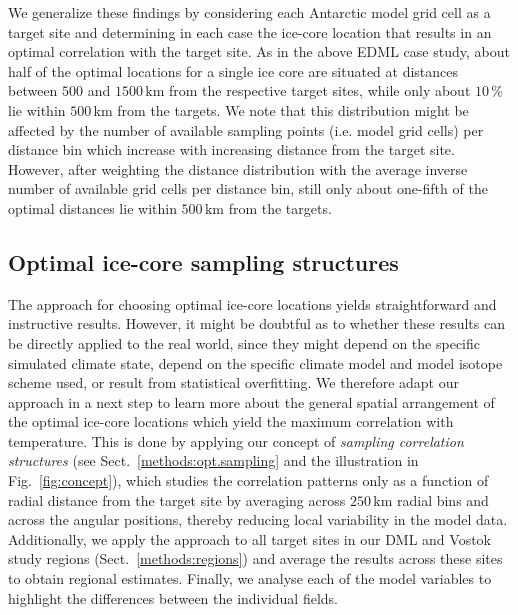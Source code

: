 \documentclass[cp]{copernicus}
\begin{document}
We generalize these findings by considering each Antarctic model grid cell as a
target site and determining in each case the ice-core location that results in
an optimal correlation with the target site. As in the above EDML case study,
about half of the optimal locations for a single ice core are situated at
distances between $500$ and $1500$\,km from the respective target sites, while
only about $10$\,\% lie within $500$\,km from the targets. We note that this
distribution might be affected by the number of available sampling points (i.e.
model grid cells) per distance bin which increase with increasing distance from
the target site. However, after weighting the distance distribution with the
average inverse number of available grid cells per distance bin, still only
about one-fifth of the optimal distances lie within $500$\,km from the targets.

\subsection{Optimal ice-core sampling structures}
\label{results:optim-spacing}

The approach for choosing optimal ice-core locations yields straightforward and
instructive results. However, it might be doubtful as to whether these results
can be directly applied to the real world, since they might depend on the
specific simulated climate state, depend on the specific climate model and model
isotope scheme used, or result from statistical overfitting. We therefore adapt
our approach in a next step to learn more about the general spatial arrangement
of the optimal ice-core locations which yield the maximum correlation with
temperature. This is done by applying our concept of \emph{sampling correlation
structures} (see Sect.~\ref{methods:opt.sampling} and the illustration in
Fig.~\ref{fig:concept}), which studies the correlation patterns only as a
function of radial distance from the target site by averaging across $250$\,km
radial bins and across the angular positions, thereby reducing local variability
in the model data. Additionally, we apply the approach to all target sites in
our DML and Vostok study regions (Sect.~\ref{methods:regions}) and average the
results across these sites to obtain regional estimates. Finally, we analyse
each of the model variables to highlight the differences between the individual
fields.
\end{document}
